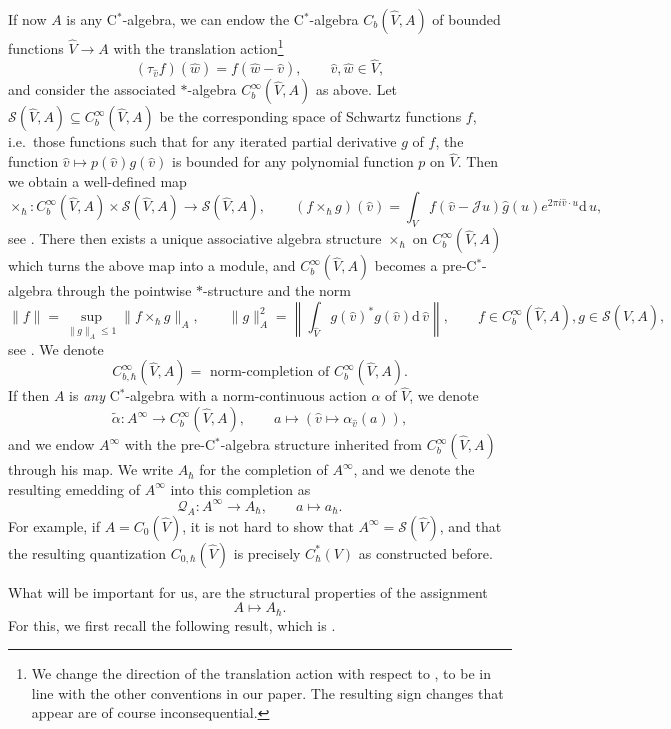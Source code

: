 \documentclass[11pt, reqno]{amsart}
\theoremstyle{definition}
\numberwithin{equation}{section}
\def\Qc{\mathcal Q}
\def\Sc{\mathcal S}
\newcommand{\rd}{\mathrm{d}\!\,}
\newcommand{\Jc}{\mathcal{J}}
\begin{document}
If now $A$ is any C$^*$-algebra, we can endow the C$^*$-algebra $C_b(\hat{V},A)$ of bounded functions $\hat{V}\rightarrow A$ with the translation action\footnote{We change the direction of the translation action with respect to \cite{Rie93}, to be in line with the other conventions in our paper. The resulting sign changes that appear are of course inconsequential.}
\[
(\tau_{\hat{v}}f)(\hat{w}) = f(\hat{w}-\hat{v}),\qquad \hat{v},\hat{w}\in \hat{V},
\]
and consider the associated $*$-algebra $C^{\infty}_b(\hat{V},A)$ as above. Let $\Sc(\hat{V},A) \subseteq C^{\infty}_b(\hat{V},A)$ be the corresponding space of Schwartz functions $f$, i.e.\ those functions such that for any iterated partial derivative $g$ of $f$, the function $\hat{v}\mapsto p(\hat{v})g(\hat{v})$ is bounded for any polynomial function $p$ on $\hat{V}$. Then we obtain a well-defined map 
\[
\times_{\hbar}\colon  C^{\infty}_b(\hat{V},A) \times \Sc(\hat{V},A) \rightarrow \Sc(\hat{V},A),\qquad (f \times_{\hbar} g)(\hat{v}) = \int_V f(\hat{v} - \Jc u)\hat{g}(u) e^{2\pi i \hat{v}\cdot u} \rd u,
\]
see \cite[Proposition 3.3]{Rie93}. There then exists a unique associative algebra structure $\times_{\hbar}$ on $C_b^{\infty}(\hat{V},A)$ which turns the above map into a module, and $C_b^{\infty}(\hat{V},A)$ becomes a pre-C$^*$-algebra through the pointwise $*$-structure and the norm 
\[
\|f\| = \sup_{\|g\|_A\leq 1} \|f\times_{\hbar} g\|_A,\qquad \|g\|_A^2 = \left\|\int_{\hat{V}} g(\hat{v})^*g(\hat{v}) \rd \hat{v}\right\|,\qquad f \in C_b^{\infty}(\hat{V},A),g\in \Sc(\hat{V},A),
\]
see \cite[Chapter 4]{Rie93}. We denote
\[
C_{b,\hbar}^{\infty}(\hat{V},A) = \textrm{ norm-completion of }C_{b}^{\infty}(\hat{V},A).
\]
If then $A$ is \emph{any} C$^*$-algebra with a norm-continuous action $\alpha$ of $\hat{V}$, we denote
\[
\widetilde{\alpha}\colon  A^{\infty} \rightarrow C_b^{\infty}(\hat{V},A),\qquad a \mapsto (\hat{v}\mapsto \alpha_{\hat{v}}(a)),
\]
and we endow $A^\infty$ with the pre-C$^*$-algebra structure inherited from $C_b^{\infty}(\hat{V},A)$ through his map. We write $A_{\hbar}$ for the completion of $A^{\infty}$, and we denote the resulting emedding of $A^{\infty}$ into this completion as 
\[
\Qc_A\colon  A^{\infty} \rightarrow A_{\hbar},\qquad a \mapsto a_{\hbar}. 
\]
For example, if $A = C_0(\hat{V})$, it is not hard to show that $A^{\infty} = \Sc(\hat{V})$, and that the resulting quantization $C_{0,\hbar}(\hat{V})$ is precisely $C_{\hbar}^*(V)$ as constructed before. 

What will be important for us, are the structural properties of the assignment 
\[
A \mapsto A_{\hbar}. 
\]
For this, we first recall the following result, which is \cite[Proposition 5.9]{Rie93}. 
\end{document}
